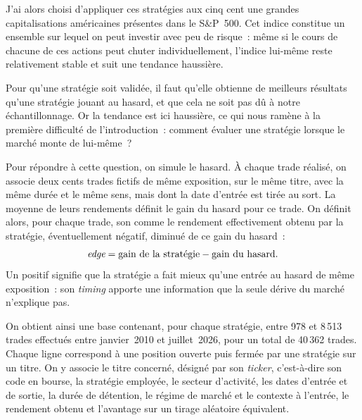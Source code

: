 J'ai alors choisi d'appliquer ces stratégies aux cinq cent une grandes
capitalisations américaines présentes dans le S\&P~500. Cet indice
constitue un ensemble sur lequel on peut investir avec peu de risque~:
même si le cours de chacune de ces actions peut chuter individuellement,
l'indice lui-même reste relativement stable et suit une tendance
haussière.

Pour qu'une stratégie soit validée, il faut qu'elle obtienne de
meilleurs résultats qu'une stratégie jouant au hasard, et que cela ne
soit pas dû à notre échantillonnage. Or la tendance est ici haussière,
ce qui nous ramène à la première difficulté de l'introduction~: comment
évaluer une stratégie lorsque le marché monte de lui-même~?

Pour répondre à cette question, on simule le hasard. À chaque trade
réalisé, on associe deux cents trades fictifs de même exposition, sur le
même titre, avec la même durée et le même sens, mais dont la date
d'entrée est tirée au sort. La moyenne de leurs rendements définit le
gain du hasard pour ce trade. On définit alors, pour chaque trade, son
\edgevar{} comme le rendement effectivement obtenu par la stratégie,
éventuellement négatif, diminué de ce gain du hasard~:
\[
  \textit{edge} = \text{gain de la stratégie} - \text{gain du hasard}.
\]
Un \edgevar{} positif signifie que la stratégie a fait mieux qu'une
entrée au hasard de même exposition~: son \emph{timing} apporte une
information que la seule dérive du marché n'explique pas.

On obtient ainsi une base contenant, pour chaque stratégie, entre 978 et
8\,513 trades effectués entre janvier~2010 et juillet~2026, pour un
total de 40\,362 trades. Chaque ligne correspond à une position ouverte
puis fermée par une stratégie sur un titre. On y associe le titre
concerné, désigné par son \emph{ticker}, c'est-à-dire son code en
bourse, la stratégie employée, le secteur d'activité, les dates d'entrée
et de sortie, la durée de détention, le régime de marché et le contexte
à l'entrée, le rendement obtenu et l'avantage \edgevar{} sur un tirage
aléatoire équivalent.

